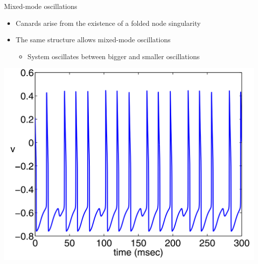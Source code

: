 \documentclass[presentation]{beamer}
\begin{document}
\begin{frame}[label={sec:org6b8ee13},plain]{Mixed-mode oscillations}
\begin{itemize}
\item Canards arise from the existence of a folded node singularity
\item The same structure allows mixed-mode oscillations
\begin{itemize}
\item System oscillates between bigger and smaller oscillations
\end{itemize}
\end{itemize}

\begin{center}
\includegraphics[width=.7\textwidth]{./mmo.png}
\end{center}
\end{frame}
\end{document}
